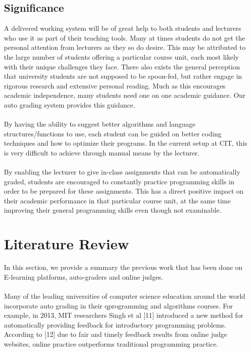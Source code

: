 \documentclass[12pt]{article}
\begin{document}
	\subsection{Significance}
			A delivered working system will be of great help to both students and lecturers who use it
		as part of their teaching tools. Many at times students do not get the personal attention
		from lecturers as they so do desire. This may be attributed to the large number of students
		offering a particular course unit, each most likely with their unique challenges they face.
		There also exists the general perception that university students are not supposed to be
		spoon-fed, but rather engage in rigorous research and extensive personal reading. Much
		as this encourages academic independence, many students need one on one academic
		guidance. Our auto grading system provides this guidance. \\ \\
			By having the ability to suggest better algorithms and language structures/functions to use,
		each student can be guided on better coding techniques and how to optimize their programs. In the current setup at 				CIT, this is very difficult to achieve through manual means by the lecturer. \\ \\
			By enabling the lecturer to give in-class assignments that can be automatically graded,
		students are encouraged to constantly practice programming skills in order to be prepared
		for these assignments. This has a direct positive impact on their academic performance in
		that particular course unit, at the same time improving their general programming skills
		even though not examinable. 


\section{Literature Review}
	In this section, we provide a summary the previous work that has been done on E-learning platforms, auto-graders and online 			judges.\\ \\
		Many of the leading universities of computer science education around the world incorporate auto grading in their 			qprogramming and algorithms courses. For example, in 2013, MIT researchers Singh et al [11] introduced a new method for 			automatically providing feedback for introductory programming problems. According to [12] due to fair and timely feedback 			results from online 	judge websites, online practice outperforms traditional programming practice.
\end{document}
